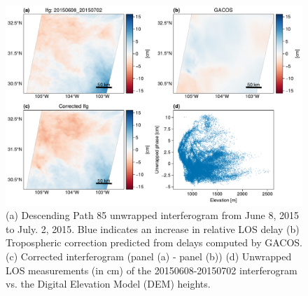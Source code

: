 \begin{figure}
	\centering
	\includegraphics[width=1.0\textwidth]{figures/chapter2-sar/figure_tropo_correct_gacos_20150608_20150702.pdf}
	\caption[GACOS tropospheric correction attempt on descending interferogram]{
		(a) Descending Path 85 unwrapped interferogram from June 8, 2015 to July. 2, 2015. Blue indicates an increase in relative LOS delay
		(b) Tropospheric correction predicted from delays computed by GACOS.
		(c) Corrected interferogram (panel (a) - panel (b))
		(d) Unwrapped LOS measurements (in cm) of the 20150608-20150702 interferogram vs. the Digital Elevation Model (DEM) heights.
	}
	\label{fig:ch2-tropo-correct-gacos-fail}
\end{figure}

\FloatBarrier

